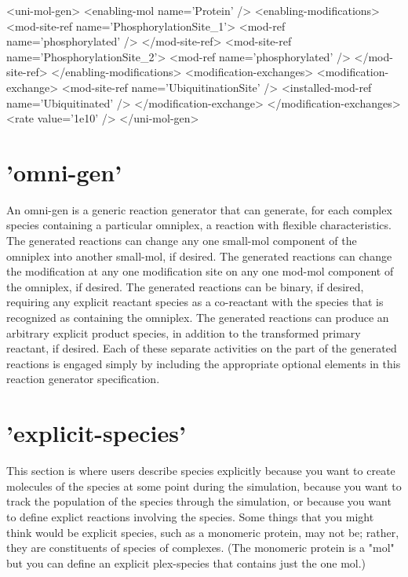 \begin{ExampleXML}[caption='A simple uni-mol-gen that represents a protein with two phosphorylation sites that is ubiquitinated']
<uni-mol-gen>
  <enabling-mol name='Protein' />
  <enabling-modifications>
    <mod-site-ref name='PhosphorylationSite_1'>
      <mod-ref name='phosphorylated' />
    </mod-site-ref>
    <mod-site-ref name='PhosphorylationSite_2'>
      <mod-ref name='phosphorylated' />
    </mod-site-ref>
  </enabling-modifications>
  <modification-exchanges>
    <modification-exchange>
      <mod-site-ref name='UbiquitinationSite' />
      <installed-mod-ref name='Ubiquitinated' />
    </modification-exchange>
  </modification-exchanges>
  <rate value='1e10' />
</uni-mol-gen>  
\end{ExampleXML}

\section{'omni-gen'}

An omni-gen is a generic reaction generator that can generate, for
each complex species containing a particular omniplex, a reaction with
flexible characteristics. The generated reactions can change any one
small-mol component of the omniplex into another small-mol, if
desired. The generated reactions can change the modification at any
one modification site on any one mod-mol component of the omniplex, if
desired. The generated reactions can be binary, if desired, requiring
any explicit reactant species as a co-reactant with the species that
is recognized as containing the omniplex. The generated reactions can
produce an arbitrary explicit product species, in addition to the
transformed primary reactant, if desired. Each of these separate
activities on the part of the generated reactions is engaged simply by
including the appropriate optional elements in this reaction generator
specification. 

\begin{ExampleXML}
\end{ExampleXML}

\section{'explicit-species'}

This section is where users describe species explicitly because you
want to create molecules of the species at some point during the
simulation, because you want to track the population of the species
through the simulation, or because you want to define explict
reactions involving the species. Some things that you might think
would be explicit species, such as a monomeric protein, may not be;
rather, they are constituents of species of complexes. (The monomeric
protein is a "mol" but you can define an explicit plex-species that
contains just the one mol.)

